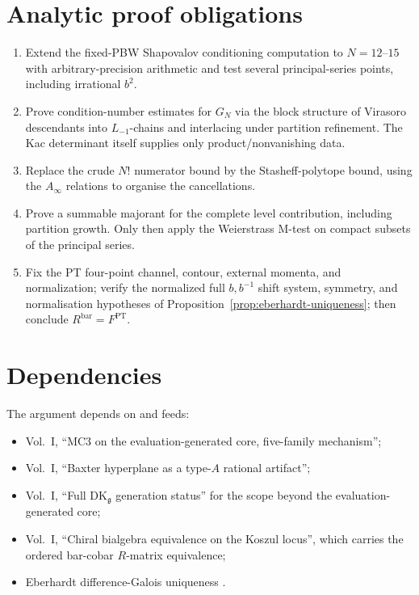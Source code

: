 \documentclass[11pt]{amsart}
\theoremstyle{definition}
\theoremstyle{remark}
\providecommand{\Ainf}{A_\infty}
\begin{document}
\section{Analytic proof obligations}

\begin{enumerate}[nosep]
\item Extend the fixed-PBW Shapovalov conditioning computation to
$N = 12$--$15$ with arbitrary-precision arithmetic and test several
principal-series points, including irrational $b^2$.
\item Prove condition-number estimates for $G_N$ via the block
structure of Virasoro descendants into $L_{-1}$-chains and interlacing
under partition refinement. The Kac determinant itself supplies only
product/nonvanishing data.
\item Replace the crude $N!$ numerator bound by the Stasheff-polytope
bound, using the $\Ainf$ relations to organise the cancellations.
\item Prove a summable majorant for the complete level contribution,
including partition growth. Only then apply the Weierstrass M-test on
compact subsets of the principal series.
\item Fix the PT four-point channel, contour, external momenta, and
normalization; verify the normalized full $b,b^{-1}$ shift system,
symmetry, and normalisation hypotheses of
Proposition~\ref{prop:eberhardt-uniqueness}; then conclude
$R^{\mathrm{bar}} = F^{\mathrm{PT}}$.
\end{enumerate}

\section{Dependencies}

The argument depends on and feeds:
\begin{itemize}[nosep]
\item Vol.~I, ``MC3 on the evaluation-generated core, five-family
mechanism'';
\item Vol.~I, ``Baxter hyperplane as a type-$A$ rational artifact'';
\item Vol.~I, ``Full $\mathrm{DK}_{\mathfrak g}$ generation status''
for the scope beyond the evaluation-generated core;
\item Vol.~I, ``Chiral bialgebra equivalence on the Koszul locus'',
which carries the ordered bar-cobar $R$-matrix equivalence;
\item Eberhardt difference-Galois uniqueness
\cite[Theorem~1.1]{Eberhardt23}.
\end{itemize}
\end{document}
